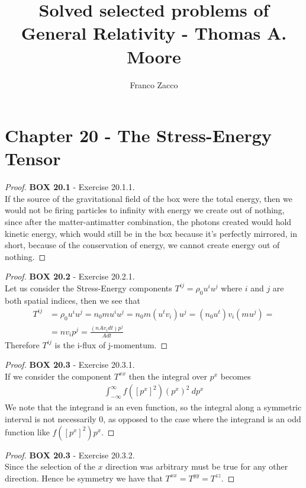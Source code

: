 \documentclass[11pt]{article}
\title{\textbf{Solved selected problems of General Relativity - Thomas A. Moore}}
\author{Franco Zacco}
\date{}
\theoremstyle{definition}
\begin{document}
\maketitle
\thispagestyle{empty}

\section*{Chapter 20 - The Stress-Energy Tensor}

\begin{proof}{\textbf{BOX 20.1} - Exercise 20.1.1.}\\
If the source of the gravitational field of the box were the total energy,
then we would not be firing particles to infinity with energy we create out of
nothing, since after the matter-antimatter combination, the photons created
would hold kinetic energy, which would still be in the box because it's
perfectly mirrored, in short, because of the conservation of energy, we cannot
create energy out of nothing.
\end{proof}

\begin{proof}{\textbf{BOX 20.2} - Exercise 20.2.1.}\\
Let us consider the Stress-Energy components $T^{ij} = \rho_0 u^i u^j$ where
$i$ and $j$ are both spatial indices, then we see that
\begin{align*}
    T^{ij} &= \rho_0 u^i u^j = n_0 m u^i u^j 
    = n_0 m (u^tv_i) u^j
    = (n_0 u^t)v_i (m u^j) =\\
    &= n v_i p^j
    = \frac{(n A v_i dt) p^j}{A dt}
\end{align*}
Therefore $T^{ij}$ is the i-flux of j-momentum.
\end{proof}

\cleardoublepage
\begin{proof}{\textbf{BOX 20.3} - Exercise 20.3.1.}\\
If we consider the component $T^{xx}$ then the integral over $p^x$ becomes
\begin{align*}
    \int_{-\infty}^\infty f([p^x]^2) (p^x)^2 ~dp^x
\end{align*}
We note that the integrand is an even function, so the integral along a
symmetric interval is not necessarily 0, as opposed to the case where the 
integrand is an odd function like $f([p^x]^2) p^x$.
\end{proof}

\begin{proof}{\textbf{BOX 20.3} - Exercise 20.3.2.}\\
Since the selection of the $x$ direction was arbitrary must be true for any
other direction. Hence be symmetry we have that $T^{xx} = T^{yy} = T^{zz}$.
\end{proof}
\end{document}
